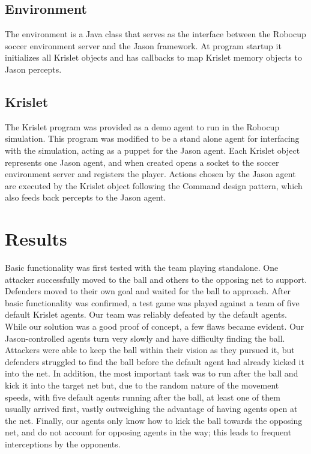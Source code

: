 \documentclass[conference]{IEEEtran}
\begin{document}
	\subsection{Environment}
	The environment is a Java class that serves as the interface between the Robocup soccer environment server and the Jason framework. At program startup it initializes all Krislet objects and has callbacks to map Krislet memory objects to Jason percepts. 
	
	\subsection{Krislet}
	The Krislet program was provided as a demo agent to run in the Robocup simulation. This program was modified to be a stand alone agent for interfacing with the simulation, acting as a puppet for the Jason agent. Each Krislet object represents one Jason agent, and when created opens a socket to the soccer environment server and registers the player. Actions chosen by the Jason agent are executed by the Krislet object following the Command design pattern, which also feeds back percepts to the Jason agent.
	
	
	\section{Results}
	Basic functionality was first tested with the team playing standalone. One attacker successfully moved to the ball and others to the opposing net to support. Defenders moved to their own goal and waited for the ball to approach. After basic functionality was confirmed, a test game was played against a team of five default Krislet agents. Our team was reliably defeated by the default agents. While our solution was a good proof of concept, a few flaws became evident. Our Jason-controlled agents turn very slowly and have difficulty finding the ball. Attackers were able to keep the ball within their vision as they pursued it, but defenders struggled to find the ball before the default agent had already kicked it into the net. In addition, the most important task was to run after the ball and kick it into the target net but, due to the random nature of the movement speeds, with five default agents running after the ball, at least one of them usually arrived first, vastly outweighing the advantage of having agents open at the net. Finally, our agents only know how to kick the ball towards the opposing net, and do not account for opposing agents in the way; this leads to frequent interceptions by the opponents.
	
\end{document}
